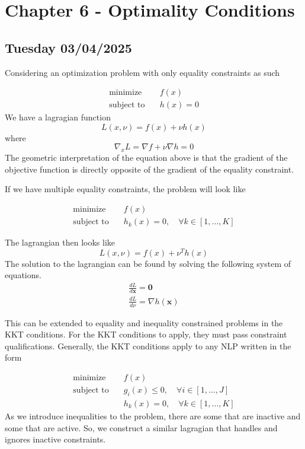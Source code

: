 \section{Chapter 6 - Optimality Conditions}
\subsection{Tuesday 03/04/2025}
Considering an optimization problem with only equality constraints as such

\begin{align}
  \text{minimize} & \quad f(x) \\
  \text{subject to} & \quad h(x) =0
\end{align}
We have a lagragian function 
\begin{equation}
    L(x, \nu) = f(x) + \nu h(x)
\end{equation}
where
\begin{equation}
    \nabla_x L = \nabla f + \nu \nabla h = 0
\end{equation}
The geometric interpretation of the equation above is that the gradient of the objective function is directly opposite of the gradient of the equality constraint.

If we have multiple equality constraints, the problem will look like

\begin{align}
  \text{minimize} & \quad f(x) \\
  \text{subject to} & \quad h_k(x) = 0, \quad \forall k \in [1,\dots,K]
\end{align}

The lagrangian then looks like 
\begin{equation}
    L(x,\nu) = f(x) + \nu^T h(x)
\end{equation}
The solution to the lagrangian can be found by solving the following system of equations.
\begin{gather}
    \frac{d L}{d \textbf{x}} = \textbf{0} \\
    \frac{d L}{d \nu} = \nabla h(\textbf{x}) 
\end{gather}

This can be extended to equality and inequality constrained problems in the KKT conditions.
For the KKT conditions to apply, they must pass constraint qualifications.
Generally, the KKT conditions apply to any NLP written in the form

\begin{align}
  \text{minimize} & \quad f(x) \\
  \text{subject to} & \quad g_i (x) \leq 0, \quad \forall i \in [1,\dots, J] \\
  & \quad h_k(x) = 0, \quad \forall k \in [1,\dots,K] 
\end{align}
As we introduce inequalities to the problem, there are some that are inactive and some that are active.
So, we construct a similar lagragian that handles and ignores inactive constraints.

